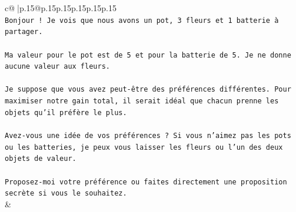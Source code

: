 \documentclass{article}
\begin{document}
{\begin{supertabular}{c@{$\;$}|p{.15\linewidth}@{}p{.15\linewidth}p{.15\linewidth}p{.15\linewidth}p{.15\linewidth}p{.15\linewidth}}
{{{\\ 
\texttt{Bonjour ! Je vois que nous avons un pot, 3 fleurs et 1 batterie à partager.} \\
\\ 
\texttt{Ma valeur pour le pot est de 5 et pour la batterie de 5. Je ne donne aucune valeur aux fleurs.} \\
\\ 
\texttt{Je suppose que vous avez peut{-}être des préférences différentes. Pour maximiser notre gain total, il serait idéal que chacun prenne les objets qu'il préfère le plus.} \\
\\ 
\texttt{Avez{-}vous une idée de vos préférences ? Si vous n'aimez pas les pots ou les batteries, je peux vous laisser les fleurs ou l'un des deux objets de valeur.} \\
\\ 
\texttt{Proposez{-}moi votre préférence ou faites directement une proposition secrète si vous le souhaitez.} \\
            }
        }
    }
    & \\ \\


\end{supertabular}}
\end{document}
